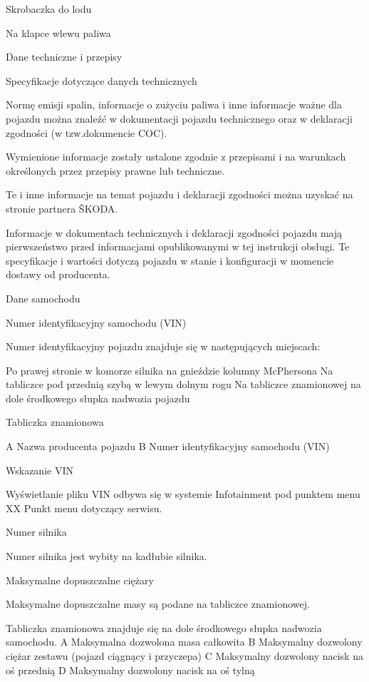 Skrobaczka do lodu

Na klapce wlewu paliwa


Dane techniczne i przepisy

Specyfikacje dotyczące danych technicznych

Normę emisji spalin, informacje o zużyciu paliwa i inne informacje ważne dla pojazdu można znaleźć w dokumentacji pojazdu technicznego oraz w deklaracji zgodności (w tzw.dokumencie COC).

Wymienione informacje zostały ustalone zgodnie z przepisami i na warunkach określonych przez przepisy prawne lub techniczne.

Te i inne informacje na temat pojazdu i deklaracji zgodności można uzyskać na stronie partnera ŠKODA.

Informacje w dokumentach technicznych i deklaracji zgodności pojazdu mają pierwszeństwo przed informacjami opublikowanymi w tej instrukcji obsługi. Te specyfikacje i wartości dotyczą pojazdu w stanie i konfiguracji w momencie dostawy od producenta.

Dane samochodu

Numer identyfikacyjny samochodu (VIN)

Numer identyfikacyjny pojazdu znajduje się w następujących miejscach:
\begin{itemizeTriangle}
	\itemTriangle Po prawej stronie w komorze silnika na gnieździe kolumny McPhersona
	\itemTriangle Na tabliczce pod przednią szybą w lewym dolnym rogu
	\itemTriangle Na tabliczce znamionowej na dole środkowego słupka nadwozia pojazdu
\end{itemizeTriangle}

Tabliczka znamionowa

A Nazwa producenta pojazdu
B Numer identyfikacyjny samochodu (VIN)

Wskazanie VIN

Wyświetlanie pliku VIN odbywa się w systemie Infotainment pod punktem menu XX Punkt menu dotyczący serwisu.

Numer silnika

Numer silnika jest wybity na kadłubie silnika.

Maksymalne dopuszczalne ciężary

Maksymalne dopuszczalne masy są podane na tabliczce znamionowej.

Tabliczka znamionowa znajduje się na dole środkowego słupka nadwozia samochodu.
A Maksymalna dozwolona masa całkowita
B Maksymalny dozwolony ciężar zestawu (pojazd ciągnący i przyczepa)
C Maksymalny dozwolony nacisk na oś przednią
D Maksymalny dozwolony nacisk na oś tylną

